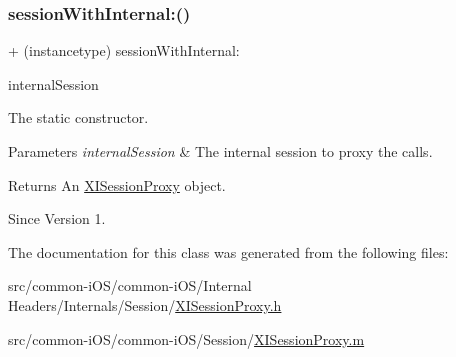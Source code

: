 \subsubsection{\texorpdfstring{session\+With\+Internal\+:()}{sessionWithInternal:()}}
{\footnotesize\ttfamily + (instancetype) session\+With\+Internal\+: \begin{DoxyParamCaption}\item[{(\hyperlink{interface_x_i_session_internal}{X\+I\+Session\+Internal} $\ast$)}]{internal\+Session }\end{DoxyParamCaption}}



The static constructor. 


\begin{DoxyParams}{Parameters}
{\em internal\+Session} & The internal session to proxy the calls. \\
\hline
\end{DoxyParams}
\begin{DoxyReturn}{Returns}
An \hyperlink{interface_x_i_session_proxy}{X\+I\+Session\+Proxy} object. 
\end{DoxyReturn}
\begin{DoxySince}{Since}
Version 1. 
\end{DoxySince}


The documentation for this class was generated from the following files\+:\begin{DoxyCompactItemize}
\item 
src/common-\/i\+O\+S/common-\/i\+O\+S/\+Internal Headers/\+Internals/\+Session/\hyperlink{_x_i_session_proxy_8h}{X\+I\+Session\+Proxy.\+h}\item 
src/common-\/i\+O\+S/common-\/i\+O\+S/\+Session/\hyperlink{_x_i_session_proxy_8m}{X\+I\+Session\+Proxy.\+m}\end{DoxyCompactItemize}

